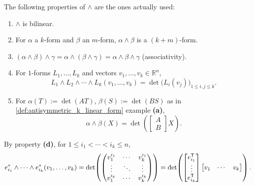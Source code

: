 The following properties of $\wedge$ are the ones actually used:
\begin{enumerate}[label=\textbf{(\alph*)}]
  \item $\wedge$ is bilinear.
  \item For $\alpha$ a $k$-form and $\beta$ an $m$-form, $\alpha\wedge\beta$ is a $(k+m)$-form.
  \item $(\alpha\wedge\beta)\wedge\gamma = \alpha\wedge(\beta\wedge\gamma) = \alpha\wedge\beta
  \wedge\gamma$ (associativity).
  \item For $1$-forms $L_1,\ldots,L_k$ and vectors $v_1,\ldots,v_k \in \mathbb{R}^n$,
  \[L_1\wedge L_2\wedge\cdots\wedge L_k(v_1,\ldots,v_k) = \det\big(L_i(v_j)\big)_{1\leq i,j
  \leq k}.\]
  \item For $\alpha(T) := \det(AT)$, $\beta(S) := \det(BS)$ as in \cref{def:antisymmetric_k_linear_form}
  example \textbf{(a)},
  \[\alpha\wedge\beta(X) = \det\!\left(\begin{bmatrix} A \\ B \end{bmatrix} X\right).\]
\end{enumerate}

\begin{example}
By property \textbf{(d)}, for $1 \leq i_1 < \cdots < i_k \leq n$,
\[
e_{i_1}^*\wedge\cdots\wedge e_{i_k}^*(v_1,\ldots,v_k) = \det\!\left(
  \begin{pmatrix} v_1^{i_1} & \cdots & v_k^{i_1} \\ \vdots & \ddots & \vdots \\ v_1^{i_k} &
  \cdots & v_k^{i_k} \end{pmatrix}\right)
  = \det\!\left(\begin{bmatrix} e_{i_1}^{\mathsf{T}} \\ \vdots \\ e_{i_k}^{\mathsf{T}} \end{bmatrix}
  \begin{bmatrix} v_1 & \cdots & v_k \end{bmatrix}\right).
\]
\end{example}

